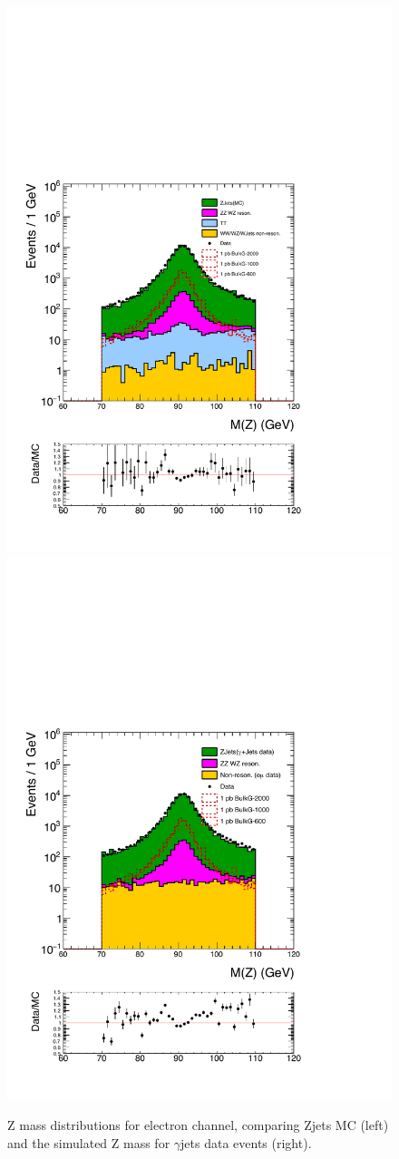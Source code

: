 \begin{figure}[htbp!]
\centering
\includegraphics[width=0.46\linewidth]{figures/MC2_Rc36p46DtReCalib_RhoWt_GMCEtaWt_tightzpt50_puWeightmoriondMC_metfilter_el_log_1pb.pdf}
\includegraphics[width=0.46\linewidth]{figures/GJets2_BkgSub_Rc36p46DtReCalib_NonReso_RhoWt_GMCEtaWt_tightzpt50_puWeightmoriondMC_muoneg_gjet_metfilter_el_log_1pb.pdf}
\caption{Z mass distributions for electron channel, comparing Zjets MC (left) and the simulated Z mass for $\gamma$jets data events (right).}
\label{fig:mz_el_zjets_gjets}
\end{figure}

